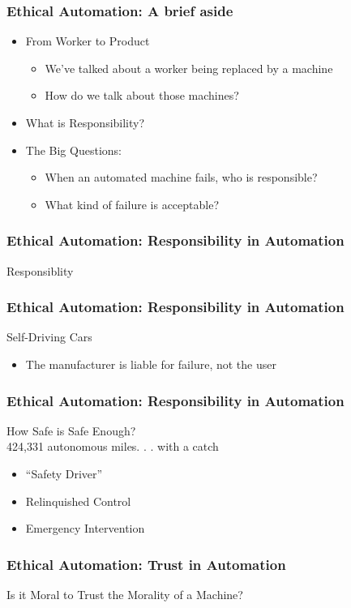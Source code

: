 \begin{frame}
  \frametitle{ Ethical Automation: A brief aside}
  \begin{itemize}
    \item From Worker to Product
      \begin{itemize}
        \item We've talked about a worker being replaced by a machine
        \item How do we talk about those machines?
      \end{itemize}
    \item What is Responsibility?
    \item The Big Questions:
      \begin{itemize}
        \item When an automated machine fails, who is responsible?
        \item What kind of failure is acceptable?
      \end{itemize}
  \end{itemize}
\end{frame}


\begin{frame}
  \frametitle{ Ethical Automation: Responsibility in Automation}
  \Large{Responsiblity}
\end{frame}


\begin{frame}
  \frametitle{ Ethical Automation: Responsibility in Automation}
  {\Large Self-Driving Cars}
  \begin{itemize}
    \item The manufacturer is liable for failure, not the user
  \end{itemize}
\end{frame}


\begin{frame}
  \frametitle{ Ethical Automation: Responsibility in Automation}
  {\Large How Safe is Safe Enough?}\\
  424,331 autonomous miles. . . with a catch
  \begin{itemize}
    \item ``Safety Driver''
    \item Relinquished Control
    \item Emergency Intervention
  \end{itemize}
\end{frame}


\begin{frame}
  \frametitle{ Ethical Automation: Trust in Automation}
  \Large{Is it Moral to Trust the Morality of a Machine?}
\end{frame}



